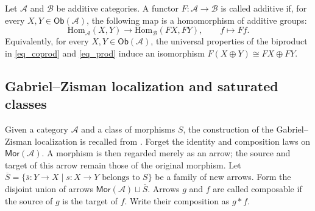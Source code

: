 \documentclass[10pt,a4paper]{amsart}
\theoremstyle{plain}
\theoremstyle{definition}
\theoremstyle{remark}
\begin{document}
Let $\mathcal{A}$ and $\mathcal{B}$ be additive categories.
A functor $F : \mathcal{A} \longrightarrow \mathcal{B}$ is called additive if, for every $X,Y \in \mathsf{Ob}(\mathcal{A})$, the following map is a homomorphism of additive groups:
\[
  \mathrm{Hom}_\mathcal{A}(X,Y) \longrightarrow \mathrm{Hom}_\mathcal{B}(FX,FY),\qquad f \longmapsto Ff.
\]
Equivalently, for every $X,Y \in \mathsf{Ob}(\mathcal{A})$, the universal properties of the biproduct in \eqref{eq_coprod} and \eqref{eq_prod} induce an isomorphism $F(X \oplus Y) \cong FX \oplus FY$.

\subsection{Gabriel--Zisman localization and saturated classes}

Given a category $\mathcal{A}$ and a class of morphisms $S$, the construction of the Gabriel--Zisman localization is recalled from \cite[Chapter~I, \S~1, pp.~6--7]{GabrielZisman}.
Forget the identity and composition laws on $\mathsf{Mor} (\mathcal{A})$.
A morphism is then regarded merely as an arrow; the source and target of this arrow remain those of the original morphism.
Let $\overline S = \{\overline s : Y \longrightarrow X\mid s : X \longrightarrow Y\text{ belongs to }S\}$ be a family of new arrows.
Form the disjoint union of arrows $\mathsf{Mor} (\mathcal{A}) \sqcup \overline S$.
Arrows $g$ and $f$ are called composable if the source of $g$ is the target of $f$.
Write their composition as $g \ast f$.
\end{document}
